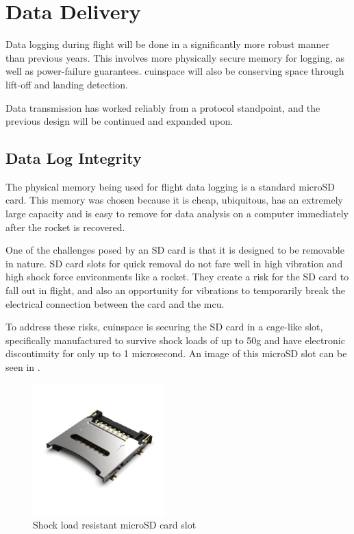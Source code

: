 \section{Data Delivery}

Data logging during flight will be done in a significantly more robust manner than previous years. This involves more
physically secure memory for logging, as well as power-failure guarantees. \Gls{cuinspace} will also be conserving
space through lift-off and landing detection.

Data transmission has worked reliably from a protocol standpoint, and the previous design will be continued and
expanded upon.

\subsection{Data Log Integrity}

The physical memory being used for flight data logging is a standard microSD card. This memory was chosen because it is
cheap, ubiquitous, has an extremely large capacity and is easy to remove for data analysis on a computer immediately
after the rocket is recovered.

One of the challenges posed by an SD card is that it is designed to be removable in nature. SD card slots for quick
removal do not fare well in high vibration and high shock force environments like a rocket. They create a risk for the
SD card to fall out in flight, and also an opportunity for vibrations to temporarily break the electrical connection
between the card and the \gls{mcu}.

To address these risks, \gls{cuinspace} is securing the SD card in a cage-like slot, specifically manufactured to
survive shock loads of up to 50g and have electronic discontinuity for only up to 1 microsecond.
\cite{sd-cage-datasheet} An image of this microSD slot can be seen in .

\begin{figure}[H]
    \centering
    \includegraphics[width=2in]{./assets/images/sd-card-cage.png}
    \caption{Shock load resistant microSD card slot \cite{sd-card-cage}}
    \label{fig:sd-card-cage}
\end{figure}

